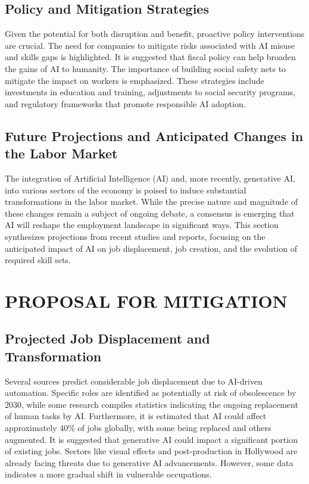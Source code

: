 \documentclass[a4paper,headinclude=on,footinclude=on,12pt,oneside]{scrbook}
\begin{document}
\subsection*{Policy and Mitigation Strategies}

Given the potential for both disruption and benefit, proactive policy interventions are crucial. The need for companies to mitigate risks associated with AI misuse and skills gaps is highlighted. It is suggested that fiscal policy can help broaden the gains of AI to humanity. The importance of building social safety nets to mitigate the impact on workers is emphasized. These strategies include investments in education and training, adjustments to social security programs, and regulatory frameworks that promote responsible AI adoption.

\subsection*{Future Projections and Anticipated Changes in the Labor Market}

The integration of Artificial Intelligence (AI) and, more recently, generative AI, into various sectors of the economy is poised to induce substantial transformations in the labor market. While the precise nature and magnitude of these changes remain a subject of ongoing debate, a consensus is emerging that AI will reshape the employment landscape in significant ways. This section synthesizes projections from recent studies and reports, focusing on the anticipated impact of AI on job displacement, job creation, and the evolution of required skill sets.

\section*{PROPOSAL FOR MITIGATION}

\subsection*{Projected Job Displacement and Transformation}

Several sources predict considerable job displacement due to AI-driven automation. Specific roles are identified as potentially at risk of obsolescence by 2030, while some research compiles statistics indicating the ongoing replacement of human tasks by AI. Furthermore, it is estimated that AI could affect approximately 40\% of jobs globally, with some being replaced and others augmented. It is suggested that generative AI could impact a significant portion of existing jobs. Sectors like visual effects and post-production in Hollywood are already facing threats due to generative AI advancements. However, some data indicates a more gradual shift in vulnerable occupations.
\end{document}
